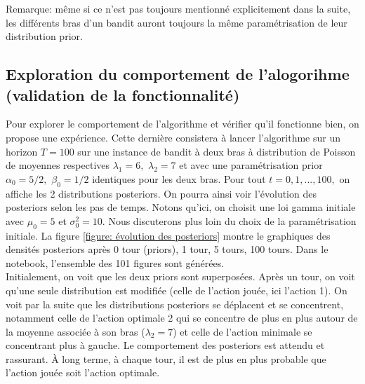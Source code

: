 \documentclass[letterpaper,11pt]{article}
\begin{document}
\vspace*{0.2cm}
Remarque: même si ce n'est pas toujours mentionné explicitement dans la suite, les différents bras d'un bandit auront toujours la même paramétrisation de leur distribution prior.

\subsection{Exploration du comportement de l'alogorihme (validation de la fonctionnalité)}

Pour explorer le comportement de l'algorithme et vérifier qu'il fonctionne bien, on propose une expérience. Cette dernière consistera à lancer l'algorithme sur un horizon $T=100$ sur une instance de bandit à deux bras à distribution de Poisson de moyennes respectives $\lambda_1=6,$ $\lambda_2=7$ et avec une paramétrisation prior $\alpha_0=5/2,$ $\beta_0=1/2$ identiques pour les deux bras. Pour tout $t=0,1,...,100,$ on affiche les 2 distributions posteriors. On pourra ainsi voir l'évolution des posteriors selon les pas de temps. Notons qu'ici, on choisit une loi gamma initiale avec $\mu_0=5$ et $\sigma_0^2=10.$ Nous discuterons plus loin du choix de la paramétrisation initiale. La figure \ref{figure: évolution des posteriors} montre le graphiques des densités posteriors après 0 tour (priors), 1 tour, 5 tours, 100 tours. Dans le notebook, l'ensemble des 101 figures sont générées. \\

Initialement, on voit que les deux priors sont superposées. Après un tour, on voit qu'une seule distribution est modifiée (celle de l'action jouée, ici l'action 1). On voit par la suite que les distributions posteriors se déplacent et se concentrent, notamment celle de l'action optimale 2 qui se concentre de plus en plus autour de la moyenne associée à son bras ($\lambda_2=7$) et celle de l'action minimale se concentrant plus à gauche. Le comportement des posteriors est attendu et rassurant. À long terme, à chaque tour, il est de plus en plus probable que l'action jouée soit l'action optimale. 
\end{document}
